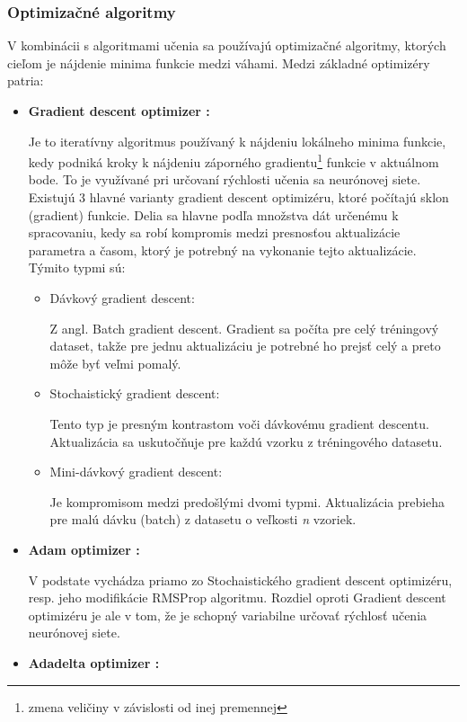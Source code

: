 \subsubsection{Optimizačné algoritmy}
\label{optimizers}
V kombinácii s algoritmami učenia sa používajú optimizačné algoritmy, ktorých cieľom je nájdenie minima funkcie medzi váhami. Medzi základné optimizéry patria:

\begin{itemize}
	\item \textbf{Gradient descent optimizer \cite{gradient_descent}:}
	
	Je to iteratívny algoritmus používaný k nájdeniu lokálneho minima funkcie, kedy podniká kroky k nájdeniu záporného gradientu\footnote{ zmena veličiny v závislosti od inej premennej} funkcie v aktuálnom bode. To je využívané pri určovaní rýchlosti učenia sa neurónovej siete. Existujú 3 hlavné varianty gradient descent optimizéru, ktoré počítajú sklon (gradient) funkcie. Delia sa hlavne podľa množstva dát určenému k spracovaniu, kedy sa robí kompromis medzi presnosťou aktualizácie parametra a časom, ktorý je potrebný na vykonanie tejto aktualizácie. Týmito typmi sú:
	\begin{itemize}
		\item{Dávkový gradient descent:}
		
		Z angl. Batch gradient descent. Gradient sa počíta pre celý tréningový dataset, takže pre jednu aktualizáciu je potrebné ho prejsť celý a preto môže byť veľmi pomalý. 
		\item {Stochaistický gradient descent:}
		
		Tento typ je presným kontrastom voči dávkovému gradient descentu. Aktualizácia sa uskutočňuje pre každú vzorku z tréningového datasetu. 
		\item{Mini-dávkový gradient descent:}
		
		Je kompromisom medzi predošlými dvomi typmi. Aktualizácia prebieha pre malú dávku (batch) z datasetu o veľkosti \textit{n} vzoriek.
	\end{itemize} 
	\item \textbf{Adam optimizer \cite{adam}:}
	
	V podstate vychádza priamo zo Stochaistického gradient descent optimizéru, resp. jeho modifikácie RMSProp algoritmu\cite{rms}. Rozdiel oproti Gradient descent optimizéru je ale v tom, že je schopný variabilne určovať rýchlosť učenia neurónovej siete.
	
	\item \textbf{Adadelta optimizer \cite{adadelta}:}
	

\end{itemize}
